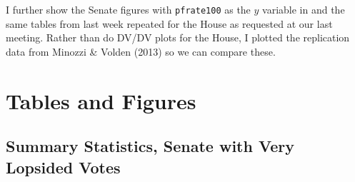 \documentclass[12pt]{article}
\begin{document}
I further show the Senate figures with \verb|pfrate100| as the $y$ variable in and the same tables from last week repeated for the House as requested at our last meeting. Rather than do DV/DV plots for the House, I plotted the replication data from Minozzi \& Volden (2013) so we can compare these.

\pagebreak



\section{Tables and Figures}

\subsection{Summary Statistics, Senate with Very Lopsided Votes}
\end{document}
